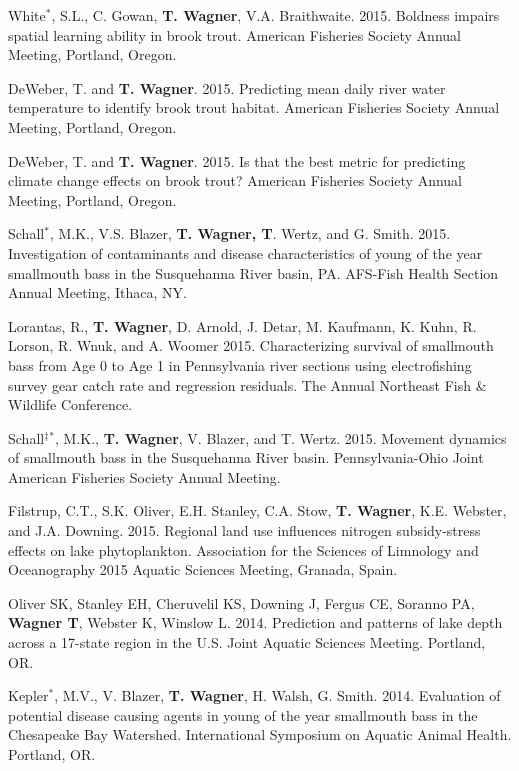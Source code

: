 \documentclass[10pt]{article}
\begin{document}
\begin{flushleft}
\begin{etaremune}
\item White$^*$, S.L., C. Gowan, {\bf T. Wagner}, V.A. Braithwaite. 2015. Boldness impairs spatial learning ability in brook trout. American Fisheries Society Annual Meeting, Portland, Oregon.

\item DeWeber, T. and {\bf T. Wagner}. 2015. Predicting mean daily river water temperature to identify brook trout habitat. American Fisheries Society Annual Meeting, Portland, Oregon.

\item DeWeber, T. and {\bf T. Wagner}. 2015. Is that the best metric for predicting climate change effects on brook trout? American Fisheries Society Annual Meeting, Portland, Oregon.

\item Schall$^*$, M.K., V.S. Blazer, {\bf T. Wagner, T}. Wertz, and G. Smith.  2015. Investigation of contaminants and disease characteristics of young of the year smallmouth bass in the Susquehanna River basin, PA. AFS-Fish Health Section Annual Meeting, Ithaca, NY. 

\item Lorantas, R., {\bf T. Wagner}, D. Arnold, J. Detar, M. Kaufmann, K. Kuhn, R. Lorson, R. Wnuk, and A. Woomer 2015. Characterizing survival of smallmouth bass from Age 0 to Age 1 in Pennsylvania river sections using electrofishing survey gear catch rate and regression residuals.  The Annual Northeast Fish \& Wildlife Conference. 

\item Schall$^\ddagger$$^*$, M.K.,  {\bf T. Wagner}, V. Blazer, and T. Wertz. 2015. Movement dynamics of smallmouth bass in the Susquehanna River basin. Pennsylvania-Ohio Joint American Fisheries Society Annual Meeting.

\item Filstrup, C.T., S.K. Oliver, E.H. Stanley, C.A. Stow, {\bf T. Wagner}, K.E. Webster, and J.A. Downing. 2015. Regional land use influences nitrogen subsidy-stress effects on lake phytoplankton. Association for the Sciences of Limnology and Oceanography 2015 Aquatic Sciences Meeting, Granada, Spain. 


\item Oliver SK, Stanley EH, Cheruvelil KS, Downing J, Fergus CE, Soranno PA, {\bf Wagner T}, Webster K, Winslow L. 2014. Prediction and patterns of lake depth across a 17-state region in the U.S. Joint Aquatic Sciences Meeting. Portland, OR.

\item Kepler$^*$, M.V., V. Blazer, {\bf T. Wagner}, H. Walsh, G. Smith. 2014. Evaluation of potential disease causing agents in young of the year smallmouth bass in the Chesapeake Bay Watershed. International Symposium on Aquatic Animal Health. Portland, OR. 


\end{etaremune}
\end{flushleft}
\end{document}
